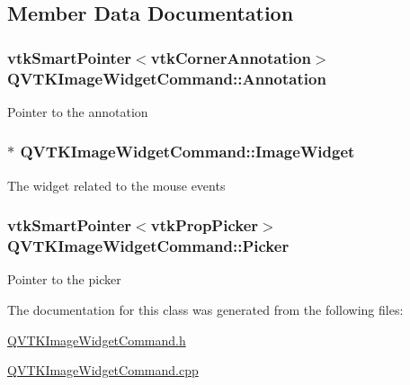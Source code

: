 \subsection{Member Data Documentation}
\hypertarget{class_q_v_t_k_image_widget_command_acf94b139e36f7523e43a982777e7e4fc}{
\subsubsection[{Annotation}]{\setlength{\rightskip}{0pt plus 5cm}vtk\-Smart\-Pointer$<$vtk\-Corner\-Annotation$>$ {\bf Q\-V\-T\-K\-Image\-Widget\-Command\-::\-Annotation}}}\label{d3/df0/class_q_v_t_k_image_widget_command_acf94b139e36f7523e43a982777e7e4fc}
Pointer to the annotation \hypertarget{class_q_v_t_k_image_widget_command_a2d5134d4197ace65e78faf4d1dbbe30c}{
\subsubsection[{Image\-Widget}]{$\ast$ {\bf Q\-V\-T\-K\-Image\-Widget\-Command\-::\-Image\-Widget}}}\label{d3/df0/class_q_v_t_k_image_widget_command_a2d5134d4197ace65e78faf4d1dbbe30c}
The widget related to the mouse events \hypertarget{class_q_v_t_k_image_widget_command_a1fd828efb713d093b8ddd54106173026}{
\subsubsection[{Picker}]{\setlength{\rightskip}{0pt plus 5cm}vtk\-Smart\-Pointer$<$vtk\-Prop\-Picker$>$ {\bf Q\-V\-T\-K\-Image\-Widget\-Command\-::\-Picker}}}\label{d3/df0/class_q_v_t_k_image_widget_command_a1fd828efb713d093b8ddd54106173026}
Pointer to the picker 

The documentation for this class was generated from the following files\-:\begin{DoxyCompactItemize}
\item 
\hyperlink{_q_v_t_k_image_widget_command_8h}{Q\-V\-T\-K\-Image\-Widget\-Command.\-h}\item 
\hyperlink{_q_v_t_k_image_widget_command_8cpp}{Q\-V\-T\-K\-Image\-Widget\-Command.\-cpp}\end{DoxyCompactItemize}
